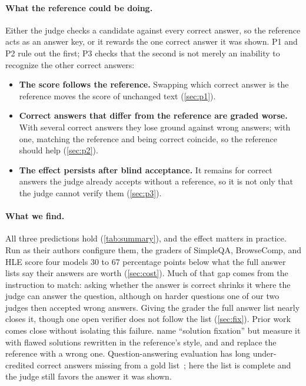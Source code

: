 \documentclass{article}
\begin{document}
\paragraph{What the reference could be doing.}
Either the judge checks a candidate against every correct answer, so the reference acts as an answer key, or it rewards the one correct answer it was shown.
P1 and P2 rule out the first; P3 checks that the second is not merely an inability to recognize the other correct answers:
\begin{itemize}[leftmargin=1.5em,itemsep=0pt,topsep=0pt]
\item[\textbf{P1}] \textbf{The score follows the reference.} Swapping which correct answer is the reference moves the score of unchanged text (\cref{sec:p1}).
\item[\textbf{P2}] \textbf{Correct answers that differ from the reference are graded worse.} With several correct answers they lose ground against wrong answers; with one, matching the reference and being correct coincide, so the reference should help (\cref{sec:p2}).
\item[\textbf{P3}] \textbf{The effect persists after blind acceptance.} It remains for correct answers the judge already accepts without a reference, so it is not only that the judge cannot verify them (\cref{sec:p3}).
\end{itemize}

\paragraph{What we find.}
All three predictions hold (\cref{tab:summary}), and the effect matters in practice.
Run as their authors configure them, the graders of SimpleQA, BrowseComp, and HLE score four models 30 to 67 percentage points below what the full answer lists say their answers are worth (\cref{sec:cost}).
Much of that gap comes from the instruction to match: asking whether the answer is correct shrinks it where the judge can answer the question, although on harder questions one of our two judges then accepted wrong answers.
Giving the grader the full answer list nearly closes it, though one open verifier does not follow the list (\cref{sec:fix}).
Prior work comes close without isolating this failure.
\citet{fixation2025} name ``solution fixation'' but measure it with flawed solutions rewritten in the reference's style, and \citet{judgingref2026} and \citet{krumdick2025nofreelabels} replace the reference with a wrong one.
Question-answering evaluation has long under-credited correct answers missing from a gold list~\citep{min2020ambigqa,kamalloo2023evaluating}; here the list is complete and the judge still favors the answer it was shown.
\end{document}
